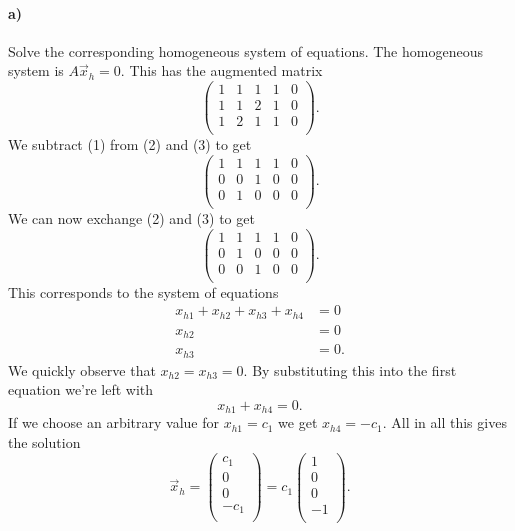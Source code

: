 \paragraph{a)} Solve the corresponding homogeneous system of equations.
\bigbreak
The homogeneous system is $A \Vec{x}_h = 0$. This has the augmented matrix
\[ 
\left( \begin{array}{cccc|c}
1 & 1 & 1 & 1 & 0\\
1 & 1 & 2 & 1 & 0\\
1 & 2 & 1 & 1 & 0\\
\end{array} \right)
.\]
We subtract (1) from (2) and (3) to get
\[ 
\left( \begin{array}{cccc|c}
1 & 1 & 1 & 1 & 0\\
0 & 0 & 1 & 0 & 0\\
0 & 1 & 0 & 0 & 0\\
\end{array} \right)
.\]
We can now exchange (2) and (3) to get
\[ 
\left( \begin{array}{cccc|c}
1 & 1 & 1 & 1 & 0\\
0 & 1 & 0 & 0 & 0\\
0 & 0 & 1 & 0 & 0\\
\end{array} \right)
.\]
This corresponds to the system of equations
\begin{align*}
  x_{h1} + x_{h2} + x_{h3} + x_{h4} &= 0 \\
  x_{h2} &= 0 \\
  x_{h3} &= 0
.\end{align*}
We quickly observe that $x_{h2} = x_{h3} = 0$. By substituting this into the first equation we're left with
\[ 
  x_{h1} + x_{h4} = 0
.\]
If we choose an arbitrary value for $x_{h1} = c_1$ we get $x_{h4} = -c_1$. All in all this gives the solution
\[ 
\Vec{x}_h = \begin{pmatrix}
c_1\\
0\\
0\\
-c_1\\
\end{pmatrix} = c_1 \begin{pmatrix}
1\\
0\\
0\\
-1\\
\end{pmatrix}
.\]



